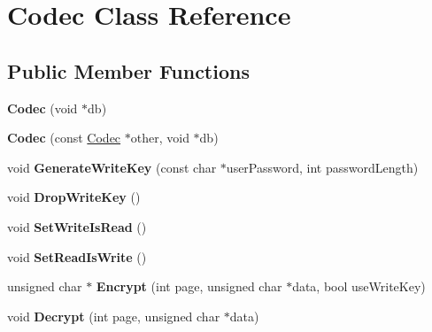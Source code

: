 \hypertarget{classCodec}{\section{Codec Class Reference}
\label{classCodec}
}
\subsection*{Public Member Functions}
\begin{DoxyCompactItemize}
\item 
\hypertarget{classCodec_ad8396c75dd5d08a20839a035a74f8308}{{\bfseries Codec} (void $\ast$db)}\label{classCodec_ad8396c75dd5d08a20839a035a74f8308}

\item 
\hypertarget{classCodec_a517715afb79e2b02794297d51bbeae57}{{\bfseries Codec} (const \hyperlink{classCodec}{Codec} $\ast$other, void $\ast$db)}\label{classCodec_a517715afb79e2b02794297d51bbeae57}

\item 
\hypertarget{classCodec_a2b0a91b694d4f5b62faf1db394d16519}{void {\bfseries Generate\-Write\-Key} (const char $\ast$user\-Password, int password\-Length)}\label{classCodec_a2b0a91b694d4f5b62faf1db394d16519}

\item 
\hypertarget{classCodec_a1525b1b530aa3b245c2db9443d63f9cc}{void {\bfseries Drop\-Write\-Key} ()}\label{classCodec_a1525b1b530aa3b245c2db9443d63f9cc}

\item 
\hypertarget{classCodec_a9c67fd2272378ad4063c7a8f81b3d3f8}{void {\bfseries Set\-Write\-Is\-Read} ()}\label{classCodec_a9c67fd2272378ad4063c7a8f81b3d3f8}

\item 
\hypertarget{classCodec_a239dee2875cdd9225662f6a22248f728}{void {\bfseries Set\-Read\-Is\-Write} ()}\label{classCodec_a239dee2875cdd9225662f6a22248f728}

\item 
\hypertarget{classCodec_a1ec56afdc958215219a8c36ca41f209c}{unsigned char $\ast$ {\bfseries Encrypt} (int page, unsigned char $\ast$data, bool use\-Write\-Key)}\label{classCodec_a1ec56afdc958215219a8c36ca41f209c}

\item 
\hypertarget{classCodec_abfb089798a07058b59fb9b844c31ae5e}{void {\bfseries Decrypt} (int page, unsigned char $\ast$data)}\label{classCodec_abfb089798a07058b59fb9b844c31ae5e}


\end{DoxyCompactItemize}
